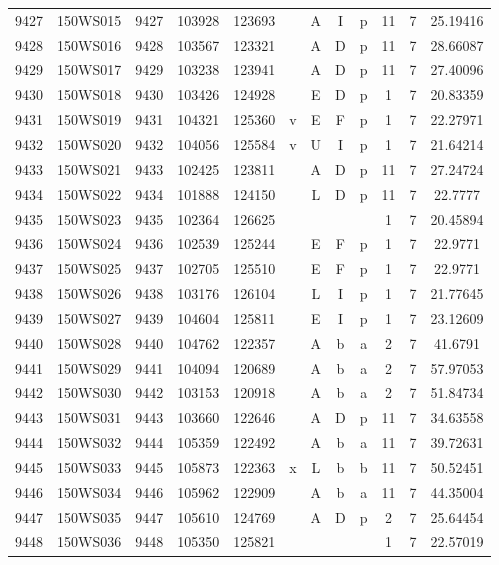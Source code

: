 \begin{tabular}{|*{12}{c|}}
9427 & 150WS015 & 9427 & 103928 & 123693 &  & A & I & p & 11 & 7 & 25.19416 \\ 
9428 & 150WS016 & 9428 & 103567 & 123321 &  & A & D & p & 11 & 7 & 28.66087 \\ 
9429 & 150WS017 & 9429 & 103238 & 123941 &  & A & D & p & 11 & 7 & 27.40096 \\ 
9430 & 150WS018 & 9430 & 103426 & 124928 &  & E & D & p & 1 & 7 & 20.83359 \\ 
9431 & 150WS019 & 9431 & 104321 & 125360 & v & E & F & p & 1 & 7 & 22.27971 \\ 
9432 & 150WS020 & 9432 & 104056 & 125584 & v & U & I & p & 1 & 7 & 21.64214 \\ 
9433 & 150WS021 & 9433 & 102425 & 123811 &  & A & D & p & 11 & 7 & 27.24724 \\ 
9434 & 150WS022 & 9434 & 101888 & 124150 &  & L & D & p & 11 & 7 & 22.7777 \\ 
9435 & 150WS023 & 9435 & 102364 & 126625 &  &  &  &  & 1 & 7 & 20.45894 \\ 
9436 & 150WS024 & 9436 & 102539 & 125244 &  & E & F & p & 1 & 7 & 22.9771 \\ 
9437 & 150WS025 & 9437 & 102705 & 125510 &  & E & F & p & 1 & 7 & 22.9771 \\ 
9438 & 150WS026 & 9438 & 103176 & 126104 &  & L & I & p & 1 & 7 & 21.77645 \\ 
9439 & 150WS027 & 9439 & 104604 & 125811 &  & E & I & p & 1 & 7 & 23.12609 \\ 
9440 & 150WS028 & 9440 & 104762 & 122357 &  & A & b & a & 2 & 7 & 41.6791 \\ 
9441 & 150WS029 & 9441 & 104094 & 120689 &  & A & b & a & 2 & 7 & 57.97053 \\ 
9442 & 150WS030 & 9442 & 103153 & 120918 &  & A & b & a & 2 & 7 & 51.84734 \\ 
9443 & 150WS031 & 9443 & 103660 & 122646 &  & A & D & p & 11 & 7 & 34.63558 \\ 
9444 & 150WS032 & 9444 & 105359 & 122492 &  & A & b & a & 11 & 7 & 39.72631 \\ 
9445 & 150WS033 & 9445 & 105873 & 122363 & x & L & b & b & 11 & 7 & 50.52451 \\ 
9446 & 150WS034 & 9446 & 105962 & 122909 &  & A & b & a & 11 & 7 & 44.35004 \\ 
9447 & 150WS035 & 9447 & 105610 & 124769 &  & A & D & p & 2 & 7 & 25.64454 \\ 
9448 & 150WS036 & 9448 & 105350 & 125821 &  &  &  &  & 1 & 7 & 22.57019 \\ 

\end{tabular}
